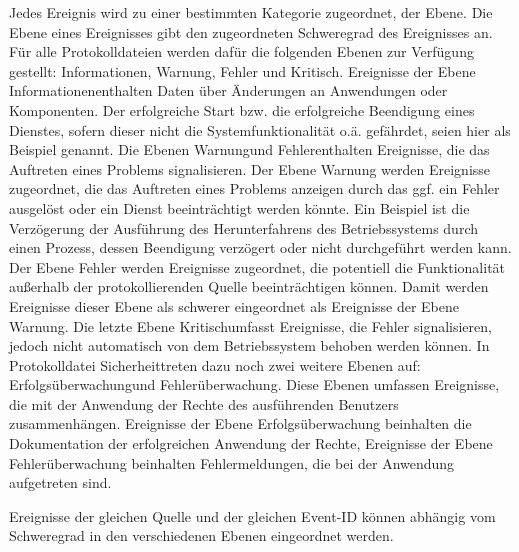 Jedes Ereignis wird zu einer bestimmten Kategorie zugeordnet, der Ebene. Die Ebene eines Ereignisses gibt den zugeordneten Schweregrad des Ereignisses an. Für alle Protokolldateien werden dafür die folgenden Ebenen zur Verfügung gestellt: Informationen, Warnung, Fehler und Kritisch. Ereignisse der Ebene \glqq Informationen\grqq enthalten Daten über Änderungen an Anwendungen oder Komponenten. Der erfolgreiche Start bzw. die erfolgreiche Beendigung eines Dienstes, sofern dieser nicht die Systemfunktionalität o.ä. gefährdet, seien hier als Beispiel genannt. Die Ebenen \glqq Warnung\grqq und \glqq Fehler\grqq enthalten Ereignisse, die das Auftreten eines Problems signalisieren. Der Ebene Warnung werden Ereignisse zugeordnet, die das Auftreten eines Problems anzeigen durch das ggf. ein Fehler ausgelöst oder ein Dienst beeinträchtigt werden könnte. Ein Beispiel ist die Verzögerung der Ausführung des Herunterfahrens des Betriebssystems durch einen Prozess, dessen Beendigung verzögert oder nicht durchgeführt werden kann. Der Ebene Fehler werden Ereignisse zugeordnet, die potentiell die Funktionalität außerhalb der protokollierenden Quelle beeinträchtigen können. Damit werden Ereignisse dieser Ebene als schwerer eingeordnet als Ereignisse der Ebene Warnung. Die letzte Ebene \glqq Kritisch\grqq umfasst Ereignisse, die Fehler signalisieren, jedoch nicht automatisch von dem Betriebssystem behoben werden können. 
In Protokolldatei \glqq Sicherheit\grqq treten dazu noch zwei weitere Ebenen auf: \glqq Erfolgsüberwachung\grqq und \glqq Fehlerüberwachung\grqq . Diese Ebenen umfassen Ereignisse, die mit der Anwendung der Rechte des ausführenden Benutzers zusammenhängen. Ereignisse der Ebene Erfolgsüberwachung beinhalten die Dokumentation der erfolgreichen Anwendung der Rechte, Ereignisse der Ebene Fehlerüberwachung beinhalten Fehlermeldungen, die bei der Anwendung aufgetreten sind.

Ereignisse der gleichen Quelle und der gleichen Event-ID können abhängig vom Schweregrad in den verschiedenen Ebenen eingeordnet werden.

